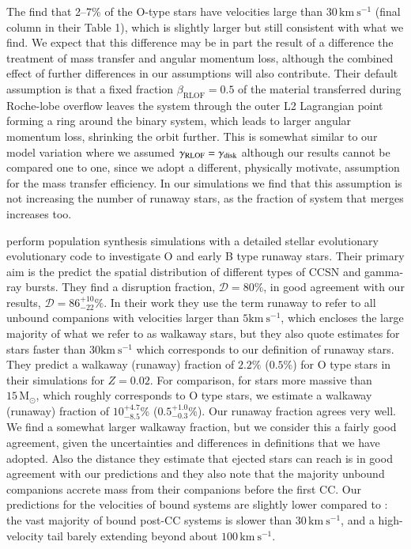 \documentclass{aa}
\newcommand{\kms}{{\mathrm{km\ s^{-1}}}}
\newcommand{\Msun}{{\mathrm{M}_\odot}}
\begin{document}
The find that  2--7\% of the O-type stars have velocities large than $30\,\kms$ (final column in their Table 1), which is slightly larger but still consistent with what we find.  We expect that this difference may be in part the result of a difference the treatment of mass transfer and angular momentum loss, although the combined effect of further differences in our assumptions will also contribute. Their default assumption is that a fixed fraction $\beta_\mathrm{RLOF} = 0.5$ of the material transferred during Roche-lobe overflow leaves the system through the outer L2 Lagrangian point forming a ring around the binary system, which leads to larger angular momentum loss, shrinking the orbit further.  This is somewhat similar to our model variation where we assumed $\gamma_{\rm RLOF} = \gamma_{\rm disk} $ although our results cannot be compared one to one, since we adopt a different, physically motivate, assumption for the mass transfer efficiency. In our simulations we find that this assumption is not increasing the number of runaway stars, as the fraction of system that merges increases too. 

\cite{eldridge:11} perform population synthesis simulations with a
detailed stellar evolutionary evolutionary code to investigate O and
early B
type runaway stars. Their primary aim is the predict the spatial distribution of different types of CCSN and gamma-ray bursts. They find a disruption fraction, $\mathcal{D}=80\%$, in good agreement with our results, $\mathcal{D} = 86^{+10}_{-22}\%$.  In their work they use the term runaway to refer to all unbound companions with velocities larger than $5\kms$, which encloses the large majority of what we refer to as walkaway stars, but they also quote estimates for stars faster than $30\kms$ which corresponds to our definition of runaway stars.  They predict a walkaway (runaway) fraction of $2.2\%$ ($0.5\%$) for O type stars
in their simulations for $Z=0.02$. For comparison, for stars more massive than $15\,\Msun$, which roughly corresponds to O type stars,  we estimate a walkaway (runaway) fraction of  $10^{+4.7}_{-8.5}$\% ($0.5^{+1.0}_{-0.3}$\%).  Our runaway fraction agrees very well.  We find a somewhat larger walkaway fraction, but we consider this a fairly good agreement, given the uncertainties and differences in definitions that we have adopted. Also the distance they estimate that ejected stars can reach is in good agreement with our predictions and they also note that the majority unbound companions accrete mass from their companions before the first CC.  Our predictions for the velocities of bound systems are slightly lower compared to \cite{eldridge:11}: the vast majority of bound post-CC systems is slower than $30\,\mathrm{km\ s^{-1}}$, and a high-velocity tail barely extending beyond about $100\,\mathrm{km\  s^{-1}}$.
\end{document}
